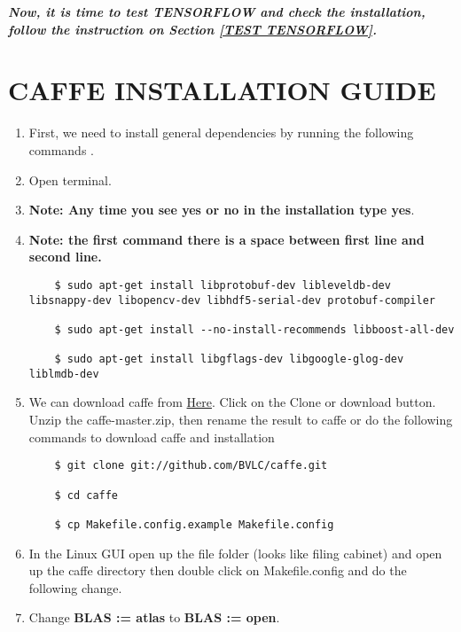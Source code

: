 \documentclass[12pt]{article}
\begin{document}
\textbf{\emph{Now, it is time to test TENSORFLOW and check the installation, follow the instruction on Section \ref{TEST TENSORFLOW}.}}

\newpage
\section{CAFFE INSTALLATION GUIDE}

\begin{enumerate}
  \item First, we need to install general dependencies by running the following commands \cite{CAFFE}.
  \item Open terminal.
  \item \textbf{Note: Any time you see yes or no in the installation type yes}.
  \item \textbf{Note: the first command there is a space between first line and second line.}

\begin{lstlisting}
    $ sudo apt-get install libprotobuf-dev libleveldb-dev libsnappy-dev libopencv-dev libhdf5-serial-dev protobuf-compiler

    $ sudo apt-get install --no-install-recommends libboost-all-dev

    $ sudo apt-get install libgflags-dev libgoogle-glog-dev liblmdb-dev
\end{lstlisting}


  \item We can download caffe from  \href{https://github.com/BVLC/caffe}{Here}. Click on the Clone or download button. Unzip the caffe-master.zip, then rename the result to caffe or do the following commands to download caffe and installation


\begin{lstlisting}
    $ git clone git://github.com/BVLC/caffe.git

    $ cd caffe

    $ cp Makefile.config.example Makefile.config
\end{lstlisting}

  \item In the Linux GUI open up the file folder (looks like filing cabinet) and open up the caffe directory then double click on Makefile.config and do the following change.
  \item Change \textbf{BLAS := atlas} to \textbf{BLAS := open}.


\end{enumerate}
\end{document}
